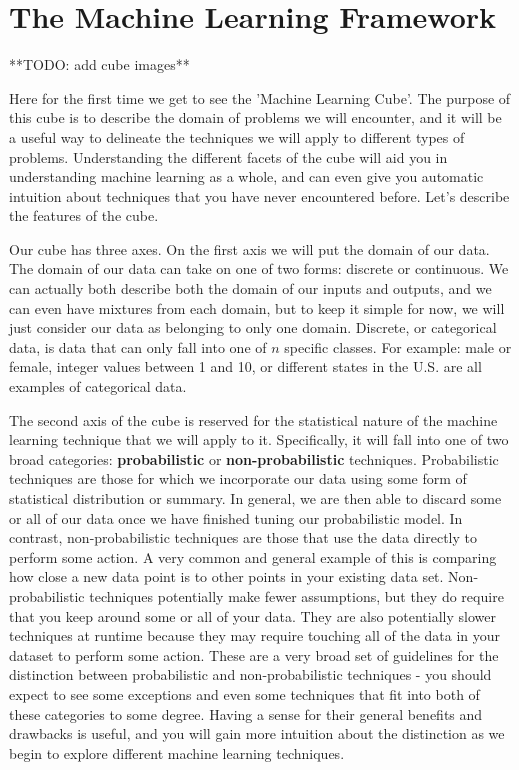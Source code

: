 \section{The Machine Learning Framework}
**TODO: add cube images**

Here for the first time we get to see the 'Machine Learning Cube'. The purpose of this cube is to describe the domain of problems we will encounter, and it will be a useful way to delineate the techniques we will apply to different types of problems. Understanding the different facets of the cube will aid you in understanding machine learning as a whole, and can even give you automatic intuition about techniques that you have never encountered before. Let's describe the features of the cube.

Our cube has three axes. On the first axis we will put the domain of our data. The domain of our data can take on one of two forms: discrete or continuous. We can actually both describe both the domain of our inputs and outputs, and we can even have mixtures from each domain, but to keep it simple for now, we will just consider our data as belonging to only one domain. Discrete, or categorical data, is data that can only fall into one of $n$ specific classes. For example: male or female, integer values between 1 and 10, or different states in the U.S. are all examples of categorical data.

The second axis of the cube is reserved for the statistical nature of the machine learning technique that we will apply to it. Specifically, it will fall into one of two broad categories: \textbf{probabilistic} or \textbf{non-probabilistic} techniques. Probabilistic techniques are those for which we incorporate our data using some form of statistical distribution or summary. In general, we are then able to discard some or all of our data once we have finished tuning our probabilistic model. In contrast, non-probabilistic techniques are those that use the data directly to perform some action. A very common and general example of this is comparing how close a new data point is to other points in your existing data set. Non-probabilistic techniques potentially make fewer assumptions, but they do require that you keep around some or all of your data. They are also potentially slower techniques at runtime because they may require touching all of the data in your dataset to perform some action. These are a very broad set of guidelines for the distinction between probabilistic and non-probabilistic techniques - you should expect to see some exceptions and even some techniques that fit into both of these categories to some degree. Having a sense for their general benefits and drawbacks is useful, and you will gain more intuition about the distinction as we begin to explore different machine learning techniques.

